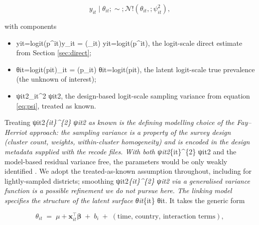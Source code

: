 \documentclass{article}
\begin{document}
\begin{equation}

y_{it} \mid \theta_{it} ;\sim; \mathcal{N}!\left( \theta_{it}, ; \psi_{it}^{2} \right),

\label{eq:fh-lik}

\end{equation}

with components

\begin{itemize}

\item yit=logit(p^it)y_{it} = (_{it})
yit​=logit(p^​it​), the logit-scale direct estimate from Section \ref{sec:direct};

\item θit=logit(pit)\theta_{it} = (p_{it})
θit​=logit(pit​), the latent logit-scale true prevalence (the unknown of interest);

\item ψit2\psi_{it}^{2}
ψit2​, the design-based logit-scale sampling variance from equation \ref{eq:psi}, treated as known.

\end{itemize}

Treating ψit2\psi\emph{\{it\}\^{}\{2\} ψit2\hspace{0pt} as known is the
defining modelling choice of the Fay--Herriot approach: the sampling
variance is a property of the survey design (cluster count, weights,
within-cluster homogeneity) and is encoded in the design metadata
supplied with the recode files. With both ψit2\psi}\{it\}\^{}\{2\}
ψit2\hspace{0pt} and the model-based residual variance free, the
parameters would be only weakly identified \citep{you2002, rao2015}. We
adopt the treated-as-known assumption throughout, including for
lightly-sampled districts; smoothing ψit2\psi\emph{\{it\}\^{}\{2\}
ψit2\hspace{0pt} via a generalised variance function \citep{rao2015} is
a possible refinement we do not pursue here. The linking model specifies
the structure of the latent surface θit\theta}\{it\} θit\hspace{0pt}. It
takes the generic form

\begin{equation}

\theta_{it} \;=\; \mu + \mathbf{x}_{it}^{\top} \bm{\beta} \;+\; b_i \;+\; (\text{time, country, interaction terms}),

\label{eq:fh-link}

\end{equation}
\end{document}
